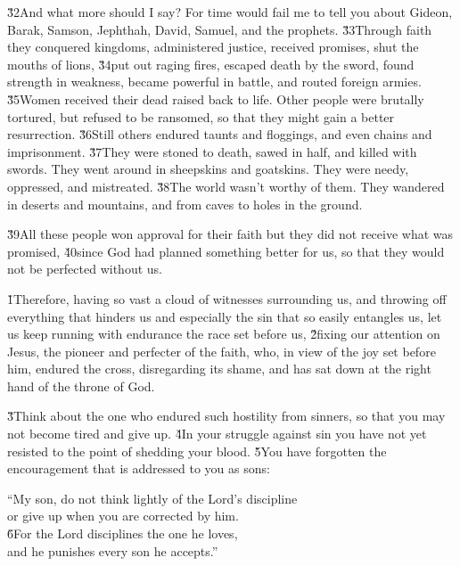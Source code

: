 \v{32}And what more should I say? For time would fail me to tell you about Gideon, Barak, Samson, Jephthah, David, Samuel, and the prophets. \v{33}Through faith they conquered kingdoms, administered justice, received promises, shut the mouths of lions, \v{34}put out raging fires, escaped death by the sword, found strength in weakness, became powerful in battle, and routed foreign armies. \v{35}Women received their dead raised back to life. Other people were brutally tortured, but refused to be ransomed, so that they might gain a better resurrection. \v{36}Still others endured taunts and floggings, and even chains and imprisonment. \v{37}They were stoned to death, sawed in half, and killed with swords. They went around in sheepskins and goatskins. They were needy, oppressed, and mistreated. \v{38}The world wasn't worthy of them. They wandered in deserts and mountains, and from caves to holes in the ground.

\v{39}All these people won approval for their faith but they did not receive what was promised, \v{40}since God had planned something better for us, so that they would not be perfected without us.

\v{1}Therefore, having so vast a cloud of witnesses surrounding us, and throwing off everything that hinders us and especially the sin that so easily entangles us, let us keep running with endurance the race set before us, \v{2}fixing our attention on Jesus, the pioneer and perfecter of the faith, who, in view of the joy set before him, endured the cross, disregarding its shame, and has sat down at the right hand of the throne of God.

\v{3}Think about the one who endured such hostility from sinners, so that you may not become tired and give up. \v{4}In your struggle against sin you have not yet resisted to the point of shedding your blood. \v{5}You have forgotten the encouragement that is addressed to you as sons:

\begin{poetry}
\poeml ``My son, do not think lightly of the Lord's discipline \\
\poemll    or give up when you are corrected by him. \\
\poeml \v{6}For the Lord disciplines the one he loves, \\
\poemll    and he punishes every son he accepts.''
\end{poetry}


